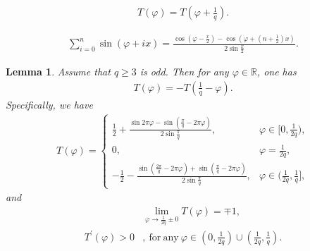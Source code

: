 \documentclass[10pt,a4paper]{amsart}
\newtheorem{lemma}{Lemma}
\begin{document}
\begin{align}
		T(\varphi)=T\left(\varphi+\frac{1}{q}\right)\label{perioTvarphi}.
\end{align}

		\begin{align}
			\sum_{i=0}^n\sin (\varphi+ix)=\frac{\cos\left(\varphi-\frac{x}{2}\right)-\cos\left(\varphi+\left(n+\frac{1}{2}\right)x\right)}{2\sin\frac{x}{2}}.\label{sintheta+ix}
		\end{align}

	\begin{lemma}\label{lssccs}Assume that $q\geq3$ is odd. Then for any $\varphi\in \mathbb{R}$, one has
		\begin{align}\label{tqduichen}
			T(\varphi)=-T\left(\frac{1}{q}-\varphi\right).
		\end{align}
		Specifically,	we have
		\begin{align}
			T(\varphi)=\begin{cases}
				\label{ssccs}\frac{1}{2}+\frac{\sin2\pi\varphi-\sin\left(\frac{\pi}{q}-2\pi\varphi\right)}{2\sin\frac{\pi}{q}}, & \varphi\in[0,\frac{1}{2q}),\\
				0, & \varphi=\frac{1}{2q},\\
				-\frac{1}{2}-\frac{\sin\left(\frac{2\pi}{q}-2\pi\varphi\right)+\sin\left(\frac{\pi}{q}-2\pi\varphi\right)}{2\sin\frac{\pi}{q}}, & \varphi\in  (\frac{1}{2q}, \frac{1}{q}],
			\end{cases}
		\end{align}
		and
		\begin{align}
			\label{mp1}&\lim_{\varphi\to\frac{1}{2q}\pm0}T(\varphi)=\mp1,\\
			\label{tqpdy0}T^{\prime}(\varphi)>0&, \mathrm{\ for\ any\ }\varphi\in\left(0,\frac{1}{2q}\right)\cup\left(\frac{1}{2q},\frac{1}{q}\right).
		\end{align}
	\end{lemma}
\end{document}
